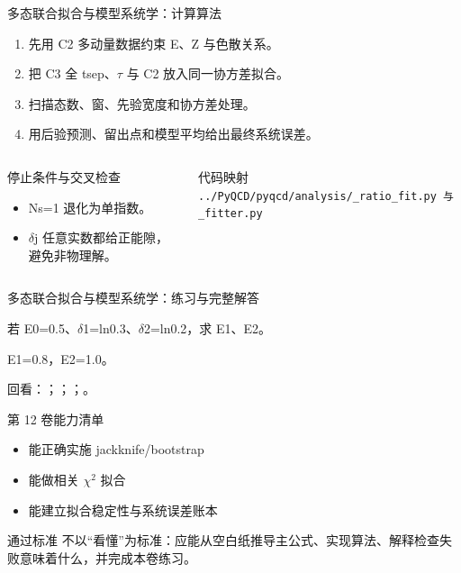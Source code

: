 \begin{frame}[t]{多态联合拟合与模型系统学：计算算法}
\footnotesize
{}\begin{enumerate}
\item 先用 C2 多动量数据约束 E、Z 与色散关系。
\item 把 C3 全 tsep、\ensuremath{\tau} 与 C2 放入同一协方差拟合。
\item 扫描态数、窗、先验宽度和协方差处理。
\item 用后验预测、留出点和模型平均给出最终系统误差。
\end{enumerate}\begin{columns}[T,onlytextwidth]
\begin{block}{停止条件与交叉检查}\scriptsize\begin{itemize}
\item[\CheckMark] Ns=1 退化为单指数。
\item[\CheckMark] \ensuremath{\delta}j 任意实数都给正能隙，避免非物理解。
\end{itemize}\end{block}
\begin{block}{代码映射}
\scriptsize \texttt{.\allowbreak{}.\allowbreak{}/\allowbreak{}PyQCD/\allowbreak{}pyqcd/\allowbreak{}analysis/\allowbreak{}\_\allowbreak{}ratio\_\allowbreak{}fit.\allowbreak{}py 与 \_\allowbreak{}fitter.\allowbreak{}py}
\end{block}\end{columns}\end{frame}

\begin{frame}[t]{多态联合拟合与模型系统学：练习与完整解答}
\footnotesize
\begin{block}{}若 E0=0.5、\ensuremath{\delta}1=ln0.3、\ensuremath{\delta}2=ln0.2，求 E1、E2。\end{block}
\begin{exampleblock}{}E1=0.8，E2=1.0。\end{exampleblock}
\vfill
\scriptsize 回看：；；；。
\end{frame}

\begin{frame}[t]{第 12 卷能力清单}
\small\begin{itemize}
\item[\CheckMark] 能正确实施 jackknife/\allowbreak{}bootstrap
\item[\CheckMark] 能做相关 \ensuremath{\chi}\ensuremath{^{2}} 拟合
\item[\CheckMark] 能建立拟合稳定性与系统误差账本
\end{itemize}\vfill\begin{block}{通过标准}
不以“看懂”为标准：应能从空白纸推导主公式、实现算法、解释检查失败意味着什么，并完成本卷练习。
\end{block}\end{frame}

